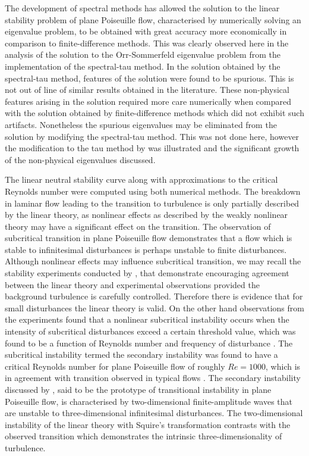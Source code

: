 \documentclass[a4paper, 12pt, twoside, openright]{article}
\numberwithin{equation}{section}
\begin{document}
The development of spectral methods has allowed the solution to the linear stability problem of plane Poiseuille flow, characterised by numerically solving an eigenvalue problem, to be obtained with great accuracy more economically in comparison to finite-difference methods. This was clearly observed here in the analysis of the solution to the Orr-Sommerfeld eigenvalue problem from the implementation of the spectral-tau method. In the solution obtained by the spectral-tau method, features of the solution were found to be spurious. This is not out of line of similar results obtained in the literature. These non-physical features arising in the solution required more care numerically when compared with the solution obtained by finite-difference methods which did not exhibit such artifacts. Nonetheless the spurious eigenvalues may be eliminated from the solution by modifying the spectral-tau method. This was not done here, however the modification to the tau method by \cite{Mcfadden90} was illustrated and the significant growth of the non-physical eigenvalues discussed. %

The linear neutral stability curve along with approximations to the critical Reynolds number were computed using both numerical methods. The breakdown in laminar flow leading to the transition to turbulence is only partially described by the linear theory, as nonlinear effects as described by the weakly nonlinear theory may have a significant effect on the transition. The observation of subcritical transition in plane Poiseuille flow demonstrates that a flow which is stable to infinitesimal disturbances is perhaps unstable to finite disturbances. Although nonlinear effects may influence subcritical transition, we may recall the stability experiments conducted by \cite{Nishioka75}, that demonstrate encouraging agreement between the linear theory and experimental observations provided the background turbulence is carefully controlled. Therefore there is evidence that for small disturbances the linear theory is valid. On the other hand observations from the experiments found that a nonlinear subcritical instability occurs when the intensity of subcritical disturbances exceed a certain threshold value, which was found to be a function of Reynolds number and frequency of disturbance \citep{Nishioka75}. The subcritical instability termed the secondary instability was found to have a critical Reynolds number for plane Poiseuille flow of roughly $Re=1000$, which is in agreement with transition observed in typical flows \citep{OrszagPatera83}. The secondary instability discussed by \cite{OrszagPatera83}, said to be the prototype of transitional instability in plane Poiseuille flow, is characterised by two-dimensional finite-amplitude waves that are unstable to three-dimensional infinitesimal disturbances. The two-dimensional instability of the linear theory with Squire's transformation contrasts with the observed transition which demonstrates the intrinsic three-dimensionality of turbulence.   
 
\end{document}
